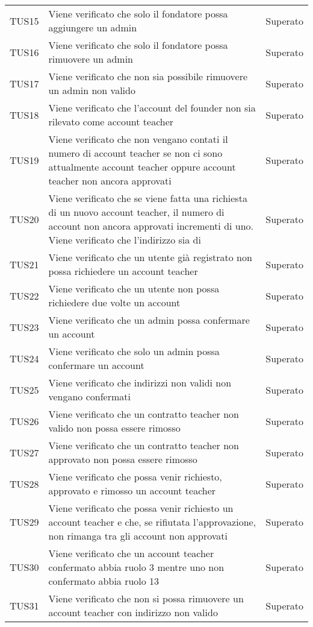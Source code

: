 \documentclass[PianoDiQualifica.tex]{subfiles}
\begin{document}
\begin{longtable}[H]{P{2cm}P{8.5cm}P{3cm}}
	TUS15 & Viene verificato che solo il fondatore possa aggiungere un admin  & Superato \\
	TUS16 & Viene verificato che solo il fondatore possa rimuovere un admin & Superato \\
	TUS17 & Viene verificato che non sia possibile rimuovere un admin non valido & Superato \\
	TUS18 & Viene verificato che l'account del founder non sia rilevato come account teacher & Superato \\
	TUS19 & Viene verificato che non vengano contati il numero di account teacher se non ci sono attualmente account teacher oppure account teacher non ancora approvati & Superato \\
	TUS20 & Viene verificato che se viene fatta una richiesta di un nuovo account teacher, il numero di account non ancora approvati incrementi di uno. Viene verificato che l'indirizzo sia di  & Superato \\
	TUS21 & Viene verificato che un utente già registrato non possa richiedere un account teacher & Superato \\
	TUS22 & Viene verificato che un utente non possa richiedere due volte un account & Superato \\
	TUS23 & Viene verificato che un admin possa confermare un account & Superato \\
	TUS24 & Viene verificato che solo un admin possa confermare un account & Superato \\
	TUS25 & Viene verificato che indirizzi non validi non vengano confermati & Superato \\
	TUS26 & Viene verificato che un contratto teacher non valido non possa essere rimosso & Superato \\
	TUS27 & Viene verificato che un contratto teacher non approvato non possa essere rimosso & Superato \\
	TUS28 & Viene verificato che possa venir richiesto, approvato e rimosso un account teacher & Superato \\
	TUS29 & Viene verificato che possa venir richiesto un account teacher e che, se rifiutata l'approvazione, non rimanga tra gli account non approvati & Superato \\
	TUS30 & Viene verificato che un account teacher confermato abbia ruolo 3 mentre uno non confermato abbia ruolo 13 & Superato \\
	TUS31 & Viene verificato che non si possa rimuovere un account teacher con indirizzo non valido & Superato \\

\end{longtable}
\end{document}

